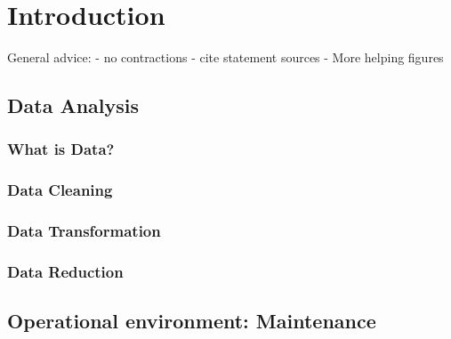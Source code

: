 \chapter{Introduction}
General advice:
- no contractions
- cite statement sources
- More helping figures

\section{Data Analysis}


\subsection{What is Data?}


\subsection{Data Cleaning}

\subsection{Data Transformation}

\subsection{Data Reduction}

\section{Operational environment: Maintenance}




